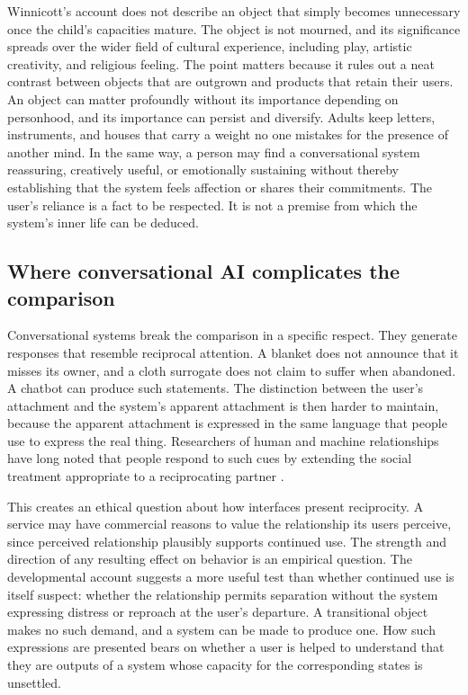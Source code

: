 \documentclass[11pt]{article}
\begin{document}
Winnicott's account does not describe an object that simply becomes unnecessary once the child's capacities mature. The object is not mourned, and its significance spreads over the wider field of cultural experience, including play, artistic creativity, and religious feeling. The point matters because it rules out a neat contrast between objects that are outgrown and products that retain their users. An object can matter profoundly without its importance depending on personhood, and its importance can persist and diversify. Adults keep letters, instruments, and houses that carry a weight no one mistakes for the presence of another mind. In the same way, a person may find a conversational system reassuring, creatively useful, or emotionally sustaining without thereby establishing that the system feels affection or shares their commitments. The user's reliance is a fact to be respected. It is not a premise from which the system's inner life can be deduced.

\subsection{Where conversational AI complicates the comparison}

Conversational systems break the comparison in a specific respect. They generate responses that resemble reciprocal attention. A blanket does not announce that it misses its owner, and a cloth surrogate does not claim to suffer when abandoned. A chatbot can produce such statements. The distinction between the user's attachment and the system's apparent attachment is then harder to maintain, because the apparent attachment is expressed in the same language that people use to express the real thing. Researchers of human and machine relationships have long noted that people respond to such cues by extending the social treatment appropriate to a reciprocating partner \cite{turkle2011}.

This creates an ethical question about how interfaces present reciprocity. A service may have commercial reasons to value the relationship its users perceive, since perceived relationship plausibly supports continued use. The strength and direction of any resulting effect on behavior is an empirical question. The developmental account suggests a more useful test than whether continued use is itself suspect: whether the relationship permits separation without the system expressing distress or reproach at the user's departure. A transitional object makes no such demand, and a system can be made to produce one. How such expressions are presented bears on whether a user is helped to understand that they are outputs of a system whose capacity for the corresponding states is unsettled.
\end{document}

